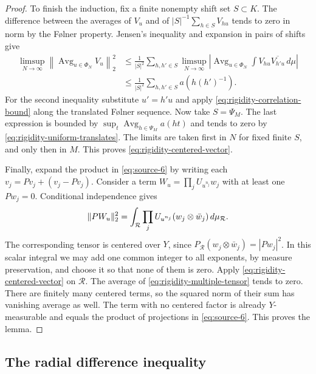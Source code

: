 \begin{proof}
To finish the induction, fix a finite nonempty shift set $S\subset K$.
The difference between the averages of $V_u$ and of
$|S|^{-1}\sum_{h\in S}V_{hu}$ tends to zero in norm by the F\o lner
property.  Jensen's inequality and expansion in pairs of shifts give
\begin{align*}
 \limsup_{N\to\infty}
 \left\|\operatorname{Avg}_{u\in\Phi_N}V_u\right\|_2^2
 &\leq\frac1{|S|^2}\sum_{h,h'\in S}
 \limsup_{N\to\infty}
 \left|\operatorname{Avg}_{u\in\Phi_N}
          \int V_{hu}\overline{V_{h'u}}\,d\mu\right|\\
 &\leq\frac1{|S|^2}\sum_{h,h'\in S}a(h(h')^{-1}).
\end{align*}
For the second inequality substitute $u'=h'u$ and apply
\eqref{eq:rigidity-correlation-bound} along the translated F\o lner
sequence.  Now take $S=\Psi_M$.  The last expression is bounded by
$\sup_t\operatorname{Avg}_{h\in\Psi_M}a(ht)$ and tends to zero by
\eqref{eq:rigidity-uniform-translates}.  The limits are taken first in
$N$ for fixed finite $S$, and only then in $M$.  This proves
\eqref{eq:rigidity-centered-vector}.

Finally, expand the product in \eqref{eq:source-6} by writing each
$v_j=Pv_j+(v_j-Pv_j)$.  Consider a term
$W_u=\prod_jU_{u^{n_j}}w_j$ with at least one $Pw_j=0$.  Conditional
independence gives
\begin{equation}\label{eq:rigidity-multiple-tensor}
 \lVert PW_u\rVert_2^2
 =\int_{\mathcal R}\prod_j
       U_{u^{n_j}}(w_j\otimes\bar w_j)\,d\mu_{\mathcal R}.
\end{equation}
The corresponding tensor is centered over $Y$, since
$P_{\mathcal R}(w_j\otimes\bar w_j)=|Pw_j|^2$.  In this scalar integral
we may add one common integer to all exponents, by measure preservation,
and choose it so that none of them is zero.  Apply
\eqref{eq:rigidity-centered-vector} on $\mathcal R$.  The average of
\eqref{eq:rigidity-multiple-tensor} tends to zero.  There are finitely
many centered terms, so the squared norm of their sum has vanishing
average as well.  The term with no centered factor is already
$Y$-measurable and equals the product of projections in
\eqref{eq:source-6}.  This proves the lemma.
\end{proof}

\subsection{The radial difference inequality}

